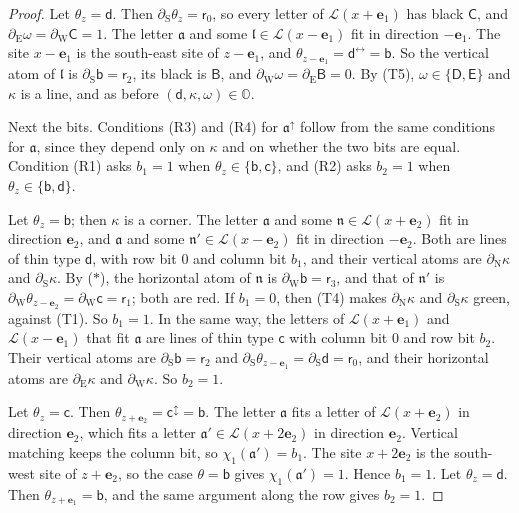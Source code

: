 \begin{proof}
Let $\theta_z=\mathsf d$. Then $\partial_{\mathrm S}\theta_z=\mathsf r_0$, so every letter of $\mathcal L(x+\mathbf e_1)$ has black $\mathsf C$, and $\partial_{\mathrm E}\omega=\partial_{\mathrm W}\mathsf C=1$. The letter $\mathfrak a$ and some $\mathfrak l\in\mathcal L(x-\mathbf e_1)$ fit in direction $-\mathbf e_1$. The site $x-\mathbf e_1$ is the south-east site of $z-\mathbf e_1$, and $\theta_{z-\mathbf e_1}=\mathsf d^{\leftrightarrow}=\mathsf b$. So the vertical atom of $\mathfrak l$ is $\partial_{\mathrm S}\mathsf b=\mathsf r_2$, its black is $\mathsf B$, and $\partial_{\mathrm W}\omega=\partial_{\mathrm E}\mathsf B=0$. By (T5), $\omega\in\{\mathsf D,\mathsf E\}$ and $\kappa$ is a line, and as before $(\mathsf d,\kappa,\omega)\in\mathbb O$.

Next the bits. Conditions (R3) and (R4) for $\mathfrak a^{\uparrow}$ follow from the same conditions for $\mathfrak a$, since they depend only on $\kappa$ and on whether the two bits are equal. Condition (R1) asks $b_1=1$ when $\theta_z\in\{\mathsf b,\mathsf c\}$, and (R2) asks $b_2=1$ when $\theta_z\in\{\mathsf b,\mathsf d\}$.

Let $\theta_z=\mathsf b$; then $\kappa$ is a corner. The letter $\mathfrak a$ and some $\mathfrak n\in\mathcal L(x+\mathbf e_2)$ fit in direction $\mathbf e_2$, and $\mathfrak a$ and some $\mathfrak n'\in\mathcal L(x-\mathbf e_2)$ fit in direction $-\mathbf e_2$. Both are lines of thin type $\mathsf d$, with row bit $0$ and column bit $b_1$, and their vertical atoms are $\partial_{\mathrm N}\kappa$ and $\partial_{\mathrm S}\kappa$. By ($\ast$), the horizontal atom of $\mathfrak n$ is $\partial_{\mathrm W}\mathsf b=\mathsf r_3$, and that of $\mathfrak n'$ is $\partial_{\mathrm W}\theta_{z-\mathbf e_2}=\partial_{\mathrm W}\mathsf c=\mathsf r_1$; both are red. If $b_1=0$, then (T4) makes $\partial_{\mathrm N}\kappa$ and $\partial_{\mathrm S}\kappa$ green, against (T1). So $b_1=1$. In the same way, the letters of $\mathcal L(x+\mathbf e_1)$ and $\mathcal L(x-\mathbf e_1)$ that fit $\mathfrak a$ are lines of thin type $\mathsf c$ with column bit $0$ and row bit $b_2$. Their vertical atoms are $\partial_{\mathrm S}\mathsf b=\mathsf r_2$ and $\partial_{\mathrm S}\theta_{z-\mathbf e_1}=\partial_{\mathrm S}\mathsf d=\mathsf r_0$, and their horizontal atoms are $\partial_{\mathrm E}\kappa$ and $\partial_{\mathrm W}\kappa$. So $b_2=1$.

Let $\theta_z=\mathsf c$. Then $\theta_{z+\mathbf e_2}=\mathsf c^{\updownarrow}=\mathsf b$. The letter $\mathfrak a$ fits a letter of $\mathcal L(x+\mathbf e_2)$ in direction $\mathbf e_2$, which fits a letter $\mathfrak a'\in\mathcal L(x+2\mathbf e_2)$ in direction $\mathbf e_2$. Vertical matching keeps the column bit, so $\chi_1(\mathfrak a')=b_1$. The site $x+2\mathbf e_2$ is the south-west site of $z+\mathbf e_2$, so the case $\theta=\mathsf b$ gives $\chi_1(\mathfrak a')=1$. Hence $b_1=1$. Let $\theta_z=\mathsf d$. Then $\theta_{z+\mathbf e_1}=\mathsf b$, and the same argument along the row gives $b_2=1$.


\end{proof}
